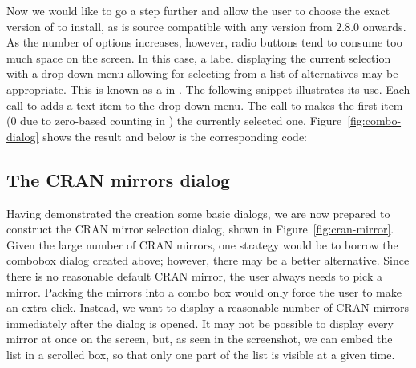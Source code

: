 \documentclass[article,shortnames]{jss}
\begin{document}
Now we would like to go a step further and allow the user to choose
the exact version of  to install, as  is source
compatible with any version from $2.8.0$ onwards. As the number of
options increases, however, radio buttons tend to consume too much
space on the screen. In this case, a label displaying the current
selection with a drop down menu allowing for selecting from a list of
alternatives may be appropriate.  This is known as a
 in . The following snippet illustrates
its use. Each call to  adds a text item to
the drop-down menu. The call to  makes the
first item ($0$ due to zero-based counting in ) the
currently selected
one. Figure~\ref{fig:combo-dialog} shows the result and below is the
corresponding code:

\subsection{The CRAN mirrors dialog}

Having demonstrated the creation some basic dialogs, we are now
prepared to construct the CRAN mirror selection dialog, shown in
Figure~\ref{fig:cran-mirror}.  Given the large number of CRAN mirrors,
one strategy would be to borrow the combobox dialog created above;
however, there may be a better alternative. Since there is no
reasonable default CRAN mirror, the user always needs to pick a
mirror. Packing the mirrors into a combo box would only force the user
to make an extra click.  Instead, we want to display a reasonable
number of CRAN mirrors immediately after the dialog is opened. It may
not be possible to display every mirror at once on the screen, but, as
seen in the screenshot, we can embed the list in a scrolled box, so
that only one part of the list is visible at a given time.
\end{document}

